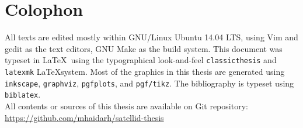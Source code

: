 \section*{Colophon}
\label{sec:colophon}

All texts are edited mostly within GNU/Linux Ubuntu 14.04 LTS, using Vim and gedit as the text editors, GNU Make as the build system.
This document was typeset in \LaTeX~using the typographical look-and-feel \texttt{classicthesis} and \verb|latexmk| \LaTeX system.
Most of the graphics in this thesis are generated using \texttt{inkscape}, \texttt{graphviz}, \texttt{pgfplots}, and \texttt{pgf/tikz}.
The bibliography is typeset using \texttt{biblatex}.
\\
All contents or sources of this thesis are available on Git repository:\\
\url{https://github.com/mhaidarh/satellid-thesis}

